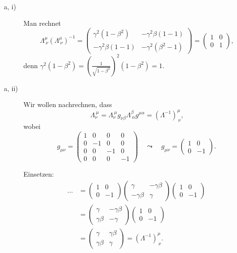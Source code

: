 \begin{description}
	\item[a, i)] Man rechnet
	\[
		\Lambda_{~\nu}^\mu \left( \Lambda_{~\nu}^\mu \right)^{-1} 
		= \begin{pmatrix}
			\gamma^2 (1 - \beta^2) & - \gamma^2 \beta (1 - 1) \\
			- \gamma^2 \beta (1 - 1) & -\gamma ^2 (\beta^2 - 1)
		\end{pmatrix}
		= \begin{pmatrix}
			1 & 0 \\
			0 & 1
		\end{pmatrix}
		\text{,}
	\] 
	denn $\gamma^2 (1 - \beta^2) = \left( \frac{1}{\sqrt{1 - \beta^2}} \right)^2 (1 - \beta^2) = 1$.
	
	\item[a, ii)] Wir wollen nachrechnen, dass
	\[
		\Lambda_\nu^{~\mu} = \Lambda_\nu^{~\mu} g_{\nu \beta} \Lambda^\beta_{~\alpha} g^{\mu \alpha} = (\Lambda^{-1})^\mu_{~\nu}
		\text{,}
	\]
	wobei 
	\[
		g_{\mu \nu} = \begin{pmatrix}
			1 & 0 & 0 & 0 \\
			0 & -1 & 0 & 0 \\
			0 & 0 & -1 & 0 \\
			0 & 0 & 0 & -1
		\end{pmatrix}
		\quad \leadsto \quad 
		g_{\mu \nu} = \begin{pmatrix}
			1 & 0 \\
			0 & -1
		\end{pmatrix}
		\text{.}
	\]
	
	Einsetzen:
	\begin{align*}
		\dots &= \begin{pmatrix}
			1 & 0 \\
			0 & -1
		\end{pmatrix}	
		\begin{pmatrix}
			\gamma & - \gamma \beta \\
			- \gamma \beta & \gamma
		\end{pmatrix}
		\begin{pmatrix}
			1 & 0 \\
			0 & -1
		\end{pmatrix} \\
		&= \begin{pmatrix}
			\gamma & - \gamma \beta \\
			\gamma \beta & - \gamma 
		\end{pmatrix}
		\begin{pmatrix}
			1 & 0 \\ 
			0 & -1
		\end{pmatrix} \\
		&= \begin{pmatrix}
			\gamma & \gamma \beta \\
			\gamma \beta & \gamma 
		\end{pmatrix} 
		= (\Lambda^{-1})^\mu_{~\nu}
		\text{.}
	\end{align*}
	

\end{description}

